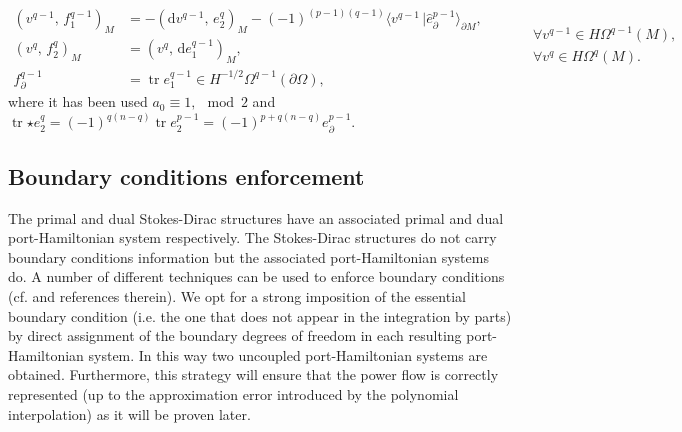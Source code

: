 \documentclass{elsarticle}
\newcommand{\revTwo}[1]{{\color{black}#1}}
\renewcommand\d{\ensuremath{\mathrm{d}}}
\DeclareMathOperator{\tr}{tr}
\newcommand*{\dual}[1]{\ensuremath{\widehat{#1}}}
\newcommand{\inpr}[3][]{\ensuremath{( #2, \, #3 )_{#1}}}
\newcommand{\dualpr}[3][]{\ensuremath{\langle #2 \, \vert #3 \rangle_{#1}}}
\begin{document}
{\begin{equation}\label{eq:dual_SD}
    \begin{aligned}
    \inpr[M]{{v}^{q-1}}{{f}^{q-1}_1} &= -\inpr[M]{\d{v}^{q-1}}{{e}_2^q} - (-1)^{(p-1)(q-1)} \dualpr[\partial M]{{v}^{q-1}}{\dual{e}_\partial^{p-1}}, \\
    \inpr[M]{v^q}{f^q_2} &= \inpr[M]{v^q}{\d e^{q-1}_1}, \\
    f_\partial^{q-1} &= \tr e_1^{q-1} \in H^{-1/2}\Omega^{q-1}(\partial\Omega),
    \end{aligned} \qquad
    \begin{aligned}
    &\forall {v}^{q-1} \in H\Omega^{q-1}(M), \\
    &\forall v^q \in H\Omega^q(M). \\
    &
    \end{aligned}
\end{equation}
where it has been used $a_0 \equiv 1, \mod 2$ and $\tr {\star e_2^q}= (-1)^{q(n-q)} \tr e_2^{p-1} = (-1)^{p+q(n-q)} e_\partial^{p-1}$.
}

\subsection{Boundary conditions enforcement}\label{subsection:weak_bcs}
\revTwo{The primal and dual Stokes-Dirac structures have an associated primal and dual port-Hamiltonian system respectively. The Stokes-Dirac structures do not carry boundary conditions information but the associated port-Hamiltonian systems do. A number of different techniques can be used to enforce boundary conditions (cf. \cite{benner2015timebc} and references therein). We opt for a strong imposition of the essential boundary condition (i.e. the one that does not appear in the integration by parts) by direct assignment of the boundary degrees of freedom in each resulting port-Hamiltonian system. In this way two uncoupled port-Hamiltonian systems are obtained. Furthermore, this strategy will ensure that the power flow is correctly represented (up to the approximation error introduced by the polynomial interpolation) as it will be proven later.}
\end{document}
